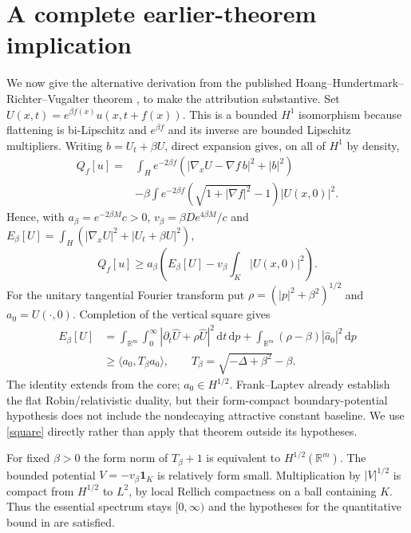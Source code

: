 \documentclass[11pt]{article}
\newcommand{\R}{\mathbb R}
\newcommand{\dd}{\,\mathrm d}
\begin{document}
\section{A complete earlier-theorem implication}\label{prior}
We now give the alternative derivation from the published
Hoang--Hundertmark--Richter--Vugalter theorem \cite{HHRV}, to make the
attribution substantive. Set
$U(x,t)=e^{\beta f(x)}u(x,t+f(x))$.
This is a bounded $H^1$ isomorphism because flattening is bi-Lipschitz and
$e^{\beta f}$ and its inverse are bounded Lipschitz multipliers.
Writing $b=U_t+\beta U$, direct expansion gives, on all of $H^1$ by density,
\begin{align*}
 Q_f[u]={}&\int_H e^{-2\beta f}
       (|\nabla_xU-\nabla f\,b|^2+|b|^2)\\
 &-\beta\int e^{-2\beta f}(\sqrt{1+|\nabla f|^2}-1)|U(x,0)|^2.
\end{align*}
Hence, with $a_\beta=e^{-2\beta M}c>0$,
$v_\beta=\beta D e^{4\beta M}/c$ and
$E_\beta[U]=\int_H(|\nabla_xU|^2+|U_t+\beta U|^2)$,
\begin{equation}\label{bridge}
 Q_f[u]\ge a_\beta\left(E_\beta[U]
                      -v_\beta\int_K|U(x,0)|^2\right).
\end{equation}
For the unitary tangential Fourier transform put
$\rho=(|p|^2+\beta^2)^{1/2}$ and $a_0=U(\cdot,0)$. Completion of the vertical
square gives
\begin{align}\label{square}
 E_\beta[U]&=\int_{\R^m}\int_0^\infty
       |\partial_t\widehat U+\rho\widehat U|^2\dd t\dd p
       +\int_{\R^m}(\rho-\beta)|\widehat a_0|^2\dd p\nonumber\\
 &\ge\langle a_0,T_\beta a_0\rangle,
 \qquad T_\beta=\sqrt{-\Delta+\beta^2}-\beta.
\end{align}
The identity extends from the core; $a_0\in H^{1/2}$.
Frank--Laptev \cite[Theorem 3.2 and Lemma 3.4]{FL} already establish the flat
Robin/relativistic duality, but their form-compact boundary-potential
hypothesis does not include the nondecaying attractive constant baseline.
We use \eqref{square} directly rather than apply that theorem outside its
hypotheses.

For fixed $\beta>0$ the form norm of $T_\beta+1$ is equivalent to
$H^{1/2}(\R^m)$. The bounded potential $V=-v_\beta\mathbf1_K$ is relatively
form small. Multiplication by $|V|^{1/2}$ is compact from $H^{1/2}$ to $L^2$,
by local Rellich compactness on a ball containing $K$. Thus the essential
spectrum stays $[0,\infty)$ and the hypotheses for the quantitative bound
in \cite{HHRV} are satisfied.
\end{document}
